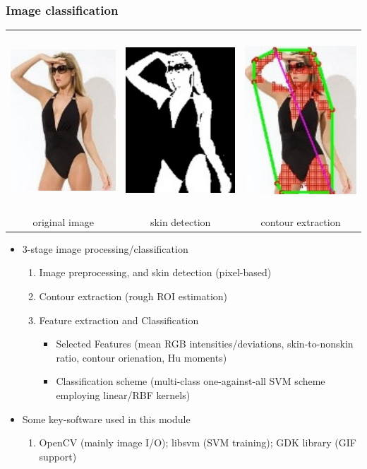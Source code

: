 \documentclass{beamer}
\begin{document}
\begin{frame}
\frametitle{Image classification}
\begin{center}
		\begin{tabular}[c]{ccc}
		\ \ \includegraphics[width=.13\columnwidth]{images/orig.pdf}  \ \ &
		\ \ \includegraphics[width=.13\columnwidth]{images/skin.pdf} \ \ &
		\ \ \includegraphics[width=.13\columnwidth]{images/grid.pdf} \ \ \\
			original image & skin detection & contour extraction \\
		\end{tabular}
\end{center}

\begin{itemize}
  \item 3-stage image processing/classification
     \begin{enumerate}
        \item Image preprocessing, and skin detection (pixel-based)
        \item Contour extraction (rough ROI estimation)
		\item Feature extraction and Classification
		  \begin{itemize}
			\item Selected Features (mean RGB intensities/deviations, skin-to-nonskin ratio, contour orienation, Hu moments)
	        \item Classification scheme (multi-class one-against-all SVM scheme employing linear/RBF kernels)
	       \end{itemize}
	\end{enumerate}
   \item Some key-software used in this module
      \begin{enumerate}
		\item OpenCV (mainly image I/O);  libsvm (SVM training); GDK library (GIF support)
	  \end{enumerate}
\end{itemize}
\end{frame}
\end{document}
